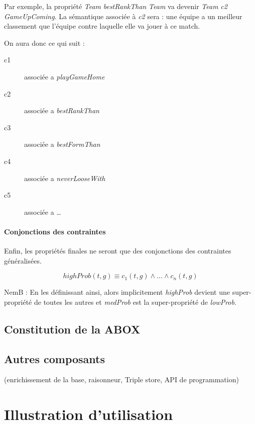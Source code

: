 \documentclass[oneside,13pt,a4paper]{article}
\newcommand\nb[1][0.3]{N\kern-#1emB : }
\begin{document}
Par exemple, la propriété \textit{Team} \textit{bestRankThan} \textit{Team} va devenir \textit{Team} \textit{c2} \textit{GameUpComing}. La sémantique associée à \textit{c2} sera : \guillemotleft une équipe a un meilleur classement que l'équipe contre laquelle elle va jouer à ce match.\guillemotright



On aura donc ce qui suit :
\begin{description}
  \item[c1] associée a \textit{playGameHome}
  \item[c2] associée a \textit{bestRankThan}
  \item[c3] associée a \textit{bestFormThan}
  \item[c4] associée a \textit{neverLooseWith}
  \item[c5] associée a \dots
\end{description}

\paragraph{Conjonctions des contraintes}

Enfin, les propriétés finales ne seront que des conjonctions des contraintes généralisées.

\[
  highProb(t,g) \equiv c_1(t,g) \wedge \dots \wedge c_n(t,g)
\]

\nb En les définissant ainsi, alors implicitement \textit{highProb} devient une super-propriété de toutes les autres et \textit{medProb} est la super-propriété de \textit{lowProb}.

\subsection{Constitution de la ABOX}

\subsection{Autres composants}

(enrichissement de la base, raisonneur, Triple store, API de programmation)


\section{Illustration d'utilisation}
\end{document}
